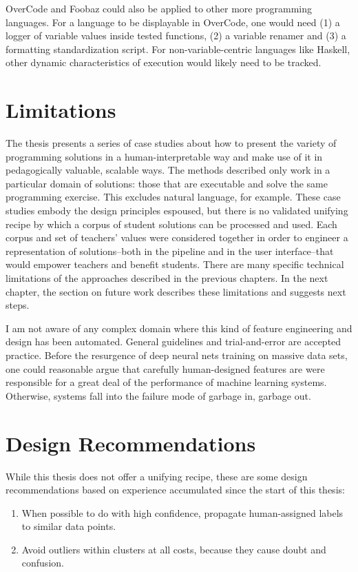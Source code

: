 OverCode and Foobaz could also be applied to other more programming languages. For a language to be displayable in OverCode, one would need (1) a logger of variable values inside tested functions, (2) a variable renamer and (3) a formatting standardization script. For non-variable-centric languages like Haskell, other dynamic characteristics of execution would likely need to be tracked.

\section{Limitations}

The thesis presents a series of case studies about how to present the variety of programming solutions in a human-interpretable way and make use of it in pedagogically valuable, scalable ways. The methods described only work in a particular domain of solutions: those that are executable and solve the same programming exercise. This excludes natural language, for example. These case studies embody the design principles espoused, but there is no validated unifying recipe by which a corpus of student solutions can be processed and used. Each corpus and set of teachers' values were considered together in order to engineer a representation of solutions--both in the pipeline and in the user interface--that would empower teachers and benefit students. There are many specific technical limitations of the approaches described in the previous chapters. In the next chapter, the section on future work describes these limitations and suggests next steps.

I am not aware of any complex domain where this kind of feature engineering and design has been automated. General guidelines and trial-and-error are accepted practice. Before the resurgence of deep neural nets training on massive data sets, one could reasonable argue that carefully human-designed features are were responsible for a great deal of the performance of machine learning systems. Otherwise, systems fall into the failure mode of garbage in, garbage out.

\section{Design Recommendations}

While this thesis does not offer a unifying recipe, these are some design recommendations based on experience accumulated since the start of this thesis:
\begin{enumerate}
\item When possible to do with high confidence, propagate human-assigned labels to similar data points.%
\item Avoid outliers within clusters at all costs, because they cause doubt and confusion. 
\end{enumerate}

